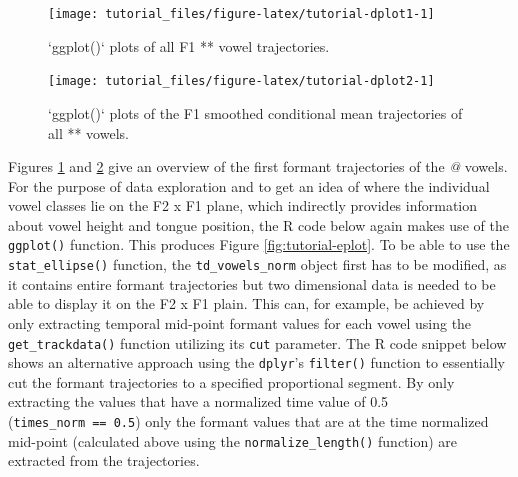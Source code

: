 \documentclass[]{book}
\begin{document}
\begin{figure}

{\centering \texttt{[image: tutorial\_files/figure-latex/tutorial-dplot1-1]} 

}

\caption{`ggplot()` plots of all F1 *\@* vowel trajectories.}\label{fig:tutorial-dplot1}
\end{figure}

\begin{figure}

{\centering \texttt{[image: tutorial\_files/figure-latex/tutorial-dplot2-1]} 

}

\caption{`ggplot()` plots of the F1 smoothed conditional mean trajectories of all *\@* vowels.}\label{fig:tutorial-dplot2}
\end{figure}

Figures \ref{fig:tutorial-dplot1} and \ref{fig:tutorial-dplot2} give an overview of the first formant trajectories of the \emph{@} vowels. For the purpose of data exploration and to get an idea of where the individual vowel classes lie on the F2 x F1 plane, which indirectly provides information about vowel height and tongue position, the R code below again makes use of the \texttt{ggplot()} function. This produces Figure \ref{fig:tutorial-eplot}. To be able to use the \texttt{stat\_ellipse()} function, the \texttt{td\_vowels\_norm} object first has to be modified, as it contains entire formant trajectories but two dimensional data is needed to be able to display it on the F2 x F1 plain. This can, for example, be achieved by only extracting temporal mid-point formant values for each vowel using the \texttt{get\_trackdata()} function utilizing its \texttt{cut} parameter. The R code snippet below shows an alternative approach using the \texttt{dplyr}'s \texttt{filter()} function to essentially cut the formant trajectories to a specified proportional segment. By only extracting the values that have a normalized time value of 0.5 (\texttt{times\_norm\ ==\ 0.5}) only the formant values that are at the time normalized mid-point (calculated above using the \texttt{normalize\_length()} function) are extracted from the trajectories.
\end{document}
